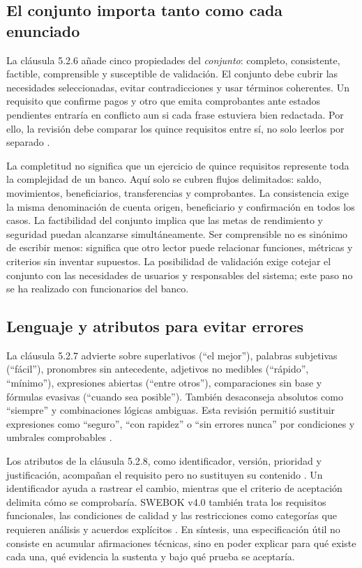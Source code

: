 \documentclass[conference,a4paper]{IEEEtran}
\begin{document}
\subsection{El conjunto importa tanto como cada enunciado}
La cláusula 5.2.6 añade cinco propiedades del \emph{conjunto}: completo, consistente, factible, comprensible y susceptible de validación. El conjunto debe cubrir las necesidades seleccionadas, evitar contradicciones y usar términos coherentes. Un requisito que confirme pagos y otro que emita comprobantes ante estados pendientes entraría en conflicto aun si cada frase estuviera bien redactada. Por ello, la revisión debe comparar los quince requisitos entre sí, no solo leerlos por separado \cite[cl.~5.2.6]{iso29148}.

La completitud no significa que un ejercicio de quince requisitos represente toda la complejidad de un banco. Aquí solo se cubren flujos delimitados: saldo, movimientos, beneficiarios, transferencias y comprobantes. La consistencia exige la misma denominación de cuenta origen, beneficiario y confirmación en todos los casos. La factibilidad del conjunto implica que las metas de rendimiento y seguridad puedan alcanzarse simultáneamente. Ser comprensible no es sinónimo de escribir menos: significa que otro lector puede relacionar funciones, métricas y criterios sin inventar supuestos. La posibilidad de validación exige cotejar el conjunto con las necesidades de usuarios y responsables del sistema; este paso no se ha realizado con funcionarios del banco.

\subsection{Lenguaje y atributos para evitar errores}
La cláusula 5.2.7 advierte sobre superlativos (``el mejor''), palabras subjetivas (``fácil''), pronombres sin antecedente, adjetivos no medibles (``rápido'', ``mínimo''), expresiones abiertas (``entre otros''), comparaciones sin base y fórmulas evasivas (``cuando sea posible''). También desaconseja absolutos como ``siempre'' y combinaciones lógicas ambiguas. Esta revisión permitió sustituir expresiones como ``seguro'', ``con rapidez'' o ``sin errores nunca'' por condiciones y umbrales comprobables \cite[cl.~5.2.7]{iso29148}.

Los atributos de la cláusula 5.2.8, como identificador, versión, prioridad y justificación, acompañan el requisito pero no sustituyen su contenido \cite[cl.~5.2.8]{iso29148}. Un identificador ayuda a rastrear el cambio, mientras que el criterio de aceptación delimita cómo se comprobaría. SWEBOK v4.0 también trata los requisitos funcionales, las condiciones de calidad y las restricciones como categorías que requieren análisis y acuerdos explícitos \cite{swebok2024}. En síntesis, una especificación útil no consiste en acumular afirmaciones técnicas, sino en poder explicar para qué existe cada una, qué evidencia la sustenta y bajo qué prueba se aceptaría.
\end{document}
